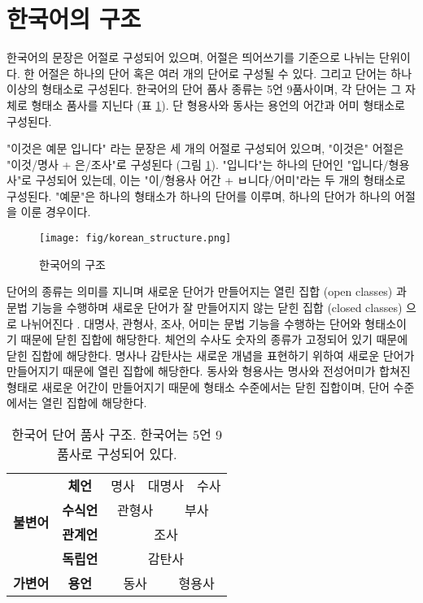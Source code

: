 \documentclass[oneside, ko,phd]{snuthesis_utf8_kor}
\begin{document}
\section{한국어의 구조}

한국어의 문장은 어절로 구성되어 있으며, 어절은 띄어쓰기를 기준으로 나뉘는 단위이다.
한 어절은 하나의 단어 혹은 여러 개의 단어로 구성될 수 있다.
그리고 단어는 하나 이상의 형태소로 구성된다.
한국어의 단어 품사 종류는 5언 9품사이며, 각 단어는 그 자체로 형태소 품사를 지닌다 (표 \ref{tab:korean_tag}).
단 형용사와 동사는 용언의 어간과 어미 형태소로 구성된다.

"이것은 예문 입니다" 라는 문장은 세 개의 어절로 구성되어 있으며, "이것은" 어절은 "이것/명사 + 은/조사"로 구성된다  (그림 \ref{tab:korean_tag}).
"입니다"는 하나의 단어인 "입니다/형용사"로 구성되어 있는데, 이는 "이/형용사 어간 + ㅂ니다/어미"라는 두 개의 형태소로 구성된다.
"예문"은 하나의 형태소가 하나의 단어를 이루며, 하나의 단어가 하나의 어절을 이룬 경우이다.

\begin{figure}[H]
\centering
\texttt{[image: fig/korean\_structure.png]}
\caption{한국어의 구조}
\label{fig:korean_structure}
\end{figure}

단어의 종류는 의미를 지니며 새로운 단어가 만들어지는 열린 집합 (open classes) 과 문법 기능을 수행하며 새로운 단어가 잘 만들어지지 않는 닫힌 집합 (closed classes) 으로 나뉘어진다 \cite{jurafsky2000speech}.
대명사, 관형사, 조사, 어미는 문법 기능을 수행하는 단어와 형태소이기 때문에 닫힌 집합에 해당한다.
체언의 수사도 숫자의 종류가 고정되어 있기 때문에 닫힌 집합에 해당한다.
명사나 감탄사는 새로운 개념을 표현하기 위하여 새로운 단어가 만들어지기 때문에 열린 집합에 해당한다.
동사와 형용사는 명사와 전성어미가 합쳐진 형태로 새로운 어간이 만들어지기 때문에 형태소 수준에서는 닫힌 집합이며, 단어 수준에서는 열린 집합에 해당한다.

\begin{table}[H]
\centering
\begin{tabular}{|c|c|c|l|c|c|c|l|}
\hline
\multirow{4}{*}{\textbf{불변어}} & \textbf{체언} & \multicolumn{2}{c|}{명사} & \multicolumn{2}{c|}{대명사} & \multicolumn{2}{c|}{수사} \\ \cline{2-8} 
 & \textbf{수식언} & \multicolumn{3}{c|}{관형사} & \multicolumn{3}{c|}{부사} \\ \cline{2-8} 
 & \textbf{관계언} & \multicolumn{6}{c|}{조사} \\ \cline{2-8} 
 & \textbf{독립언} & \multicolumn{6}{c|}{감탄사} \\ \hline
\textbf{가변어} & \textbf{용언} & \multicolumn{3}{c|}{동사} & \multicolumn{3}{c|}{형용사} \\ \hline
\end{tabular}
\caption{한국어 단어 품사 구조. 한국어는 5언 9품사로 구성되어 있다.}
\label{tab:korean_tag}
\end{table}
\end{document}
